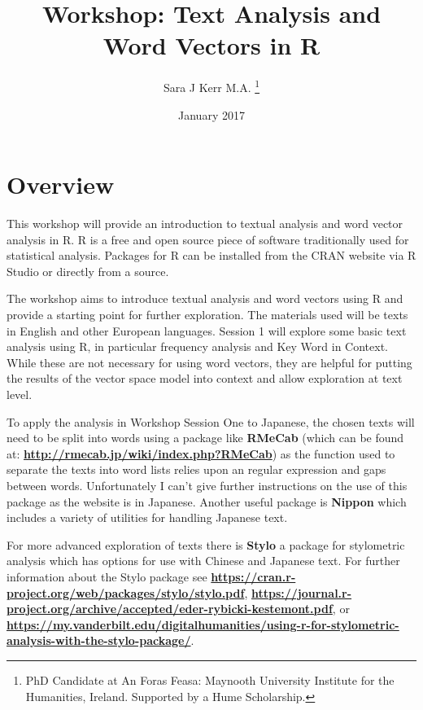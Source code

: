 \documentclass[12pt]{article}
\title{Workshop: Text Analysis and Word Vectors in R}
\author{Sara J Kerr M.A. 
 \thanks{PhD Candidate at An Foras Feasa: Maynooth University Institute for the Humanities, Ireland. \newline Supported by a Hume Scholarship.}}
\date{January 2017}
\begin{document}
\sffamily
\setlength{\parindent}{0pt}
\setlength{\parskip}{1em}

\begin{titlepage}
\maketitle
\end{titlepage}

\tableofcontents

\section*{Overview}
This workshop will provide an introduction to textual analysis and word vector analysis in R.  R is a free and open source piece of software traditionally used for statistical analysis. Packages for R can be installed from the CRAN website via R Studio or directly from a source.

The workshop aims to introduce textual analysis and word vectors using R and provide a starting point for further exploration. The materials used will be texts in English and other European languages. Session 1 will explore some basic text analysis using R, in particular frequency analysis and Key Word in Context. While these are not necessary for using word vectors, they are helpful for putting the results of the vector space model into context and allow exploration at text level.

To apply the analysis in Workshop Session One to Japanese, the chosen texts will need to be split into words using a package like \textbf{RMeCab} (which can be found at: \textbf{\url{http://rmecab.jp/wiki/index.php?RMeCab}}) as the function used to separate the texts into word lists relies upon an regular expression and gaps between words. Unfortunately I can't give further instructions on the use of this package as the website is in Japanese. Another useful package is \textbf{Nippon} which includes a variety of utilities for handling Japanese text. 

For more advanced exploration of texts there is \textbf{Stylo} a package for stylometric analysis which has options for use with Chinese and Japanese text. For further information about the Stylo package see \textbf{\url{https://cran.r-project.org/web/packages/stylo/stylo.pdf}}, \textbf{\url{https://journal.r-project.org/archive/accepted/eder-rybicki-kestemont.pdf}}, or \textbf{\url{https://my.vanderbilt.edu/digitalhumanities/using-r-for-stylometric-analysis-with-the-stylo-package/}}.
\end{document}
